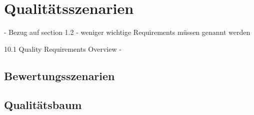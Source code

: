\chapter{Qualitätsszenarien}
- Bezug auf section 1.2 
- weniger wichtige Requirements müssen genannt werden

10.1 Quality Requirements Overview
- 

\section{Bewertungsszenarien}

\section{Qualitätsbaum}
